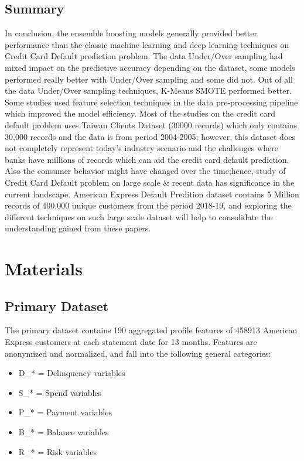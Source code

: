 \documentclass[twoside,11pt,a4paper]{article}
\begin{document}
\subsection{Summary}
In conclusion, the ensemble boosting models generally provided better performance than the classic machine learning and deep learning techniques on Credit Card Default prediction problem. The data Under/Over sampling had mixed impact on the predictive accuracy depending on the dataset, some models performed really better with Under/Over sampling and some did not. Out of all the data Under/Over sampling techniques, K-Means \acs{SMOTE} performed better. Some studies used feature selection techniques in the data pre-processing pipeline which improved the model efficiency. Most of the studies on the credit card default problem uses Taiwan Clients Dataset (30000 records) \citep{yeh2009comparisons} which only contains 30,000 records and the data is from period 2004-2005; however, this dataset does not completely represent today's industry scenario and the challenges where banks have millions of records which can aid the credit card default prediction. Also the consumer behavior might have changed over the time;hence, study of Credit Card Default problem on large scale \& recent data has significance in the current landscape. American Express Default Predition  dataset \citep{amex-default-prediction-dataset} contains 5 Million records of 400,000 unique customers from the period 2018-19, and exploring the different techniques on such large scale dataset will help to consolidate the understanding gained from these papers.

\vfill
\clearpage
\section{Materials}\label{sec:materials}

\subsection{Primary Dataset}
The primary dataset contains 190 aggregated profile features of 458913 American Express customers at each statement date for 13 months. Features are anonymized and normalized, and fall into the following general categories:

\begin{itemize}
	\item D\_* = Delinquency variables
	\item S\_* = Spend variables
	\item P\_* = Payment variables
	\item B\_* = Balance variables
	\item R\_* = Risk variables	
\end{itemize}
\end{document}
